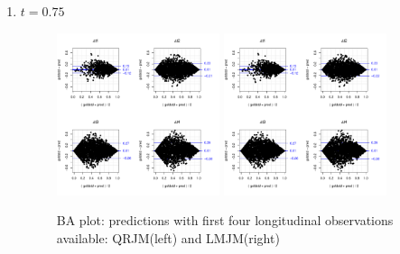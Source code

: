 \documentclass{article}
\begin{document}
\begin{enumerate}
\item $t=0.75$
\begin{figure}[H]
\centering
\includegraphics[width=0.45\textwidth]{qt25fit_t3.pdf}
\includegraphics[width=0.45\textwidth]{meanfit_t3.pdf}
\caption{BA plot: predictions with first four longitudinal observations available: QRJM(left) and LMJM(right)}
\end{figure}

\end{enumerate}



\end{document}
